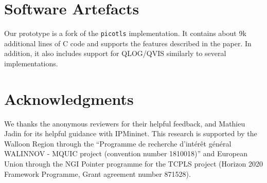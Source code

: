 %


\section*{Software Artefacts}

Our \tcpls prototype is a fork of the \texttt{picotls}  implementation.
It contains about 9k additional lines of C code and supports the features
described in the paper. In addition, it also includes support for QLOG/QVIS
\cite{marx2020debugging} similarly to several \quic implementations.


\section*{Acknowledgments}

We thanks the anonymous reviewers for their helpful feedback, and Mathieu Jadin
for its helpful guidance with IPMininet. This research is supported by the Walloon
Region through the ``Programme de recherche d'intérêt général
WALINNOV - MQUIC project (convention number 1810018)'' and European Union 
through the NGI Pointer programme for the TCPLS project (Horizon 2020 Framework 
Programme, Grant agreement number 871528).


